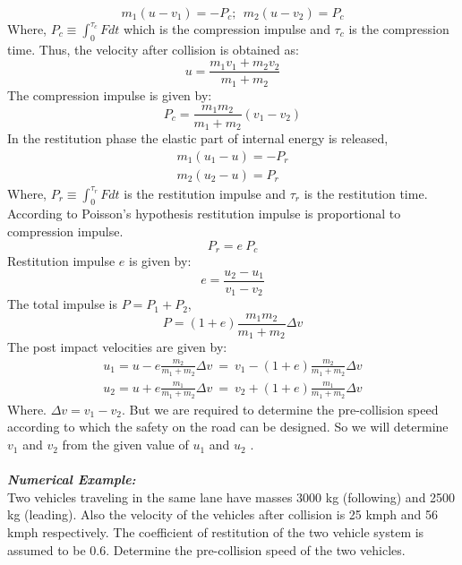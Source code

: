 \begin{equation}
	m_1(u - v_1) = -P_c; \:\: m_2(u - v_2) = P_c
\end{equation}
Where, $ P_c \equiv \int_{0}^{\tau_c} F dt $ which is the compression impulse and $ \tau_c $ is the compression time. Thus, the velocity after collision is obtained as:
\begin{equation}
	u = \frac{m_1 v_1 + m_2 v_2}{m_1 + m_2}
\end{equation}
The compression impulse is given by:
\begin{equation}
	P_c = \frac{m_1 m_2}{m_1 + m_2} (v_1 - v_2)
\end{equation}
In the restitution phase the elastic part of internal energy is released,
\begin{gather}
	m_1(u_1 - u) = -P_r\\
	m_2(u_2 - u) = P_r
\end{gather}
Where, $ P_r \equiv \int_{0}^{\tau_r} F dt $ is the restitution impulse and $ \tau_r $ is the restitution time. According to Poisson's hypothesis restitution impulse is proportional to compression impulse.
\begin{equation}
	P_r = e \: P_c
\end{equation}
Restitution impulse $ e $ is given by:
\begin{equation}
	e = \frac{u_2 - u_1}{v_1 - v_2}
\end{equation}
The total impulse is $ P = P_1 + P_2 $,
\begin{equation}
	P = (1 + e) \frac{m_1 m_2}{m_1 + m_2} \Delta v 
\end{equation}
The post impact velocities are given by:
\begin{gather}
	u_1 = u - e \frac{m_2}{m_1 + m_2} \Delta v \: = \: v_1 - (1 + e) \frac{m_2}{m_1 + m_2} \Delta v\\
	u_2 = u + e \frac{m_1}{m_1 + m_2} \Delta v \: = \: v_2 + (1 + e) \frac{m_1}{m_1 + m_2} \Delta v
\end{gather}
Where. $ \Delta v = v_1 - v_2 $. But we are required to determine the pre-collision speed according to which the safety on the road can be designed. So we will determine $ v_1 $ and $ v_2 $ from the given value of $ u_1 $ and $ u_2 $ .\\\\
\textbf{\textit{Numerical Example:}}\\
Two vehicles traveling in the same lane have masses 3000 kg (following) and 2500 kg (leading). Also the velocity of the vehicles after collision is 25 kmph and 56 kmph respectively. The coefficient of restitution of the two vehicle system is assumed to be 0.6. Determine the pre-collision speed of the two vehicles.\\
